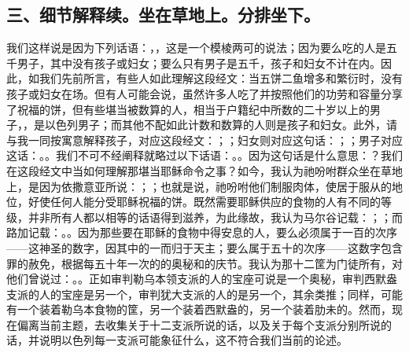 
\subsection{三、细节解释续。坐在草地上。分排坐下。}

我们这样说是因为下列话语：，，这是一个模棱两可的说法；因为要么吃的人是五千男子，其中没有孩子或妇女；要么只有男子是五千，孩子和妇女不计在内。因此，如我们先前所言，有些人如此理解这段经文：当五饼二鱼增多和繁衍时，没有孩子或妇女在场。但有人可能会说，虽然许多人吃了并按照他们的功劳和容量分享了祝福的饼，但有些堪当被数算的人，相当于户籍纪中所数的二十岁以上的男子，，是以色列男子；而其他不配如此计数和数算的人则是孩子和妇女。此外，请与我一同按寓意解释孩子，对应这段经文：；；妇女则对应这句话：；；男子对应这话：。。我们不可不经阐释就略过以下话语：。。因为这句话是什么意思：？我们在这段经文中当如何理解那堪当耶稣命令之事？如今，我认为祂吩咐群众坐在草地上，是因为依撒意亚所说：；；也就是说，祂吩咐他们制服肉体，使居于服从的地位，好使任何人能分受耶稣祝福的饼。既然需要耶稣供应的食物的人有不同的等级，并非所有人都以相等的话语得到滋养，为此缘故，我认为马尔谷记载：；；而路加记载：。。因为那些要在耶稣的食物中得安息的人，要么必须属于一百的次序——这神圣的数字，因其中的一而归于天主；要么属于五十的次序——这数字包含罪的赦免，根据每五十年一次的的奥秘和的庆节。我认为那十二筐为门徒所有，对他们曾说过：。。正如审判勒乌本领支派的人的宝座可说是一个奥秘，审判西默盎支派的人的宝座是另一个，审判犹大支派的人的是另一个，其余类推；同样，可能有一个装着勒乌本食物的筐，另一个装着西默盎的，另一个装着肋未的。然而，现在偏离当前主题，去收集关于十二支派所说的话，以及关于每个支派分别所说的话，并说明以色列每一支派可能象征什么，这不符合我们当前的论述。\par

